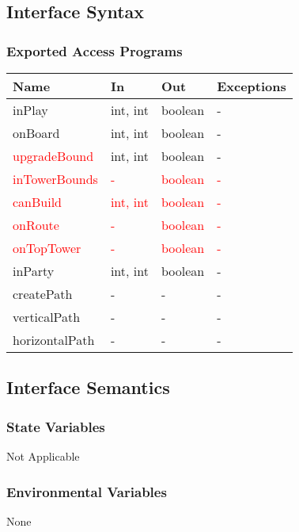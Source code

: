 \documentclass[12,english]{article}
\begin{document}
\subsection{Interface Syntax}
\subsubsection{Exported Access Programs}
\begin{table}[h!]
    \centering
    \begin{tabular}{|p{4cm}|p{2cm}|p{2cm}|p{2cm}|}
    \hline
    \textbf {Name}  & {In} & {Out} & {Exceptions} \\
    \hline
    inPlay & int, int & boolean & -\\
    \hline
    onBoard & int, int & boolean & -\\
    \hline
    \textcolor{red}{upgradeBound} & int, int & boolean & -\\
    \hline
    \textcolor{red}{inTowerBounds} & \textcolor{red}{-} & \textcolor{red}{boolean} & \textcolor{red}{-}\\
    \hline
    \textcolor{red}{canBuild} & \textcolor{red}{int, int} & \textcolor{red}{boolean} & \textcolor{red}{-}\\
    \hline
    \textcolor{red}{onRoute} & \textcolor{red}{-} & \textcolor{red}{boolean} & \textcolor{red}{-}\\
    \hline
    \textcolor{red}{onTopTower} & \textcolor{red}{-} & \textcolor{red}{boolean} & \textcolor{red}{-}\\
    \hline
    inParty & int, int & boolean & -\\
    \hline
    createPath & - & - & -\\
    \hline
    verticalPath & - & - & -\\
    \hline
    horizontalPath & - & - & -\\
    \hline
    \end{tabular}
\end{table}
\subsection{Interface Semantics}
\subsubsection{State Variables}
Not Applicable 
\subsubsection{Environmental Variables}
None
\end{document}
